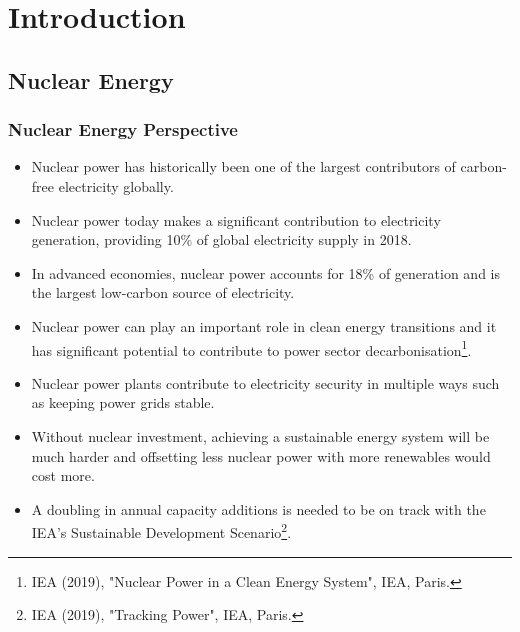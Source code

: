 \section{Introduction}
\subsection{Nuclear Energy}
\frame
{
  \frametitle{Nuclear Energy Perspective}
	\begin{itemize}
		\item<+-> Nuclear power has historically been one of the largest contributors of carbon-free electricity globally.
		\item<+-> Nuclear power today makes a significant contribution to electricity generation, providing 10\% of global electricity supply in 2018.
		\item<+-> In advanced economies, nuclear power accounts for 18\% of generation and is the largest low-carbon source of electricity.
		\item<+-> Nuclear power can play an important role in clean energy transitions and it has significant potential to contribute to power sector decarbonisation\footnote{ IEA (2019), "Nuclear Power in a Clean Energy System", IEA, Paris.}.
		\item<+-> Nuclear power plants contribute to electricity security in multiple ways such as keeping power grids stable.
		\item<+-> Without nuclear investment, achieving a sustainable energy system will be much harder and offsetting less nuclear power with more renewables would cost more.
		\item<+-> A doubling in annual capacity additions is needed to be on track with the IEA's Sustainable Development Scenario\footnote{ IEA (2019), "Tracking Power", IEA, Paris.}.
	\end{itemize}
}

